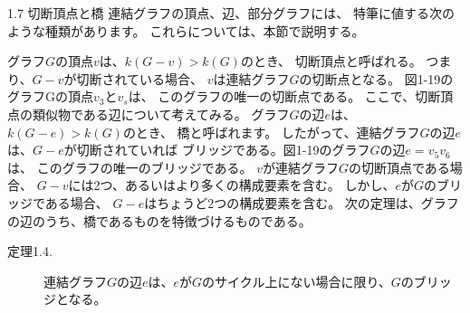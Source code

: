 
1.7 切断頂点と橋
連結グラフの頂点、辺、部分グラフには、
特筆に値する次のような種類があります。
これらについては、本節で説明する。

グラフ$G$の頂点$v$は、$k(G-v) > k(G)$のとき、
切断頂点と呼ばれる。
つまり、$G-v$が切断されている場合、
$v$は連結グラフ$G$の切断点となる。
図1-19のグラフGの頂点$v_3$と$v_s$は、
このグラフの唯一の切断点である。
ここで、切断頂点の類似物である辺について考えてみる。
グラフ$G$の辺$e$は、$k(G-e) > k(G)$のとき、
橋と呼ばれます。
したがって、連結グラフ$G$の辺$e$は、$G-e$が切断されていれば
ブリッジである。図1-19のグラフ$G$の辺$e=v_5v_6$は、
このグラフの唯一のブリッジである。
$v$が連結グラフ$G$の切断頂点である場合、
$G-v$には2つ、あるいはより多くの構成要素を含む。
しかし、$e$が$G$のブリッジである場合、
$G-e$はちょうど2つの構成要素を含む。
次の定理は、グラフの辺のうち、橋であるものを特徴づけるものである。
\begin{description}
  \item[定理1.4.] 連結グラフ$G$の辺$e$は、$e$が$G$のサイクル上にない場合に限り、$G$のブリッジとなる。
\end{description}